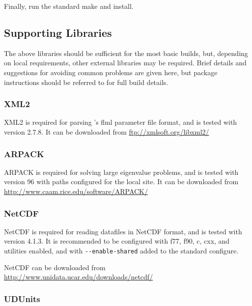 Finally, run the standard make and install.

\subsection{Supporting Libraries}
\label{sec:required_libraries_supporting}

The above libraries should be sufficient for the most basic \fluidity builds,
but, depending on local requirements, other external libraries may be required.
Brief details and suggestions for avoiding common problems are given here, but
package instructions should be referred to for full build details.

\subsubsection{XML2}
\label{sec:required_libraries_supporting_xml2}

XML2 is required for parsing \fluidity's flml parameter file format, and is
tested with version 2.7.8. It can be downloaded from \url{ftp://xmlsoft.org/libxml2/}

\subsubsection{ARPACK}
\label{sec:required_libraries_supporting_arpack}

ARPACK is required for solving large eigenvalue problems, and is tested with
version 96 with paths configured for the local site. It can be downloaded from
\url{http://www.caam.rice.edu/software/ARPACK/}

\subsubsection{NetCDF}
\label{sec:required_libraries_supporting_netcdf}

NetCDF is required for reading datafiles in NetCDF format, and is tested with
version 4.1.3. It is recommended to be configured with f77, f90, c, cxx, and
utilities enabled, and with \lstinline[language=bash]+--enable-shared+ added to
the standard configure. 

NetCDF can be downloaded from \url{http://www.unidata.ucar.edu/downloads/netcdf/}

\subsubsection{UDUnits}
\label{sec:required_libraries_supporting_udunits}

